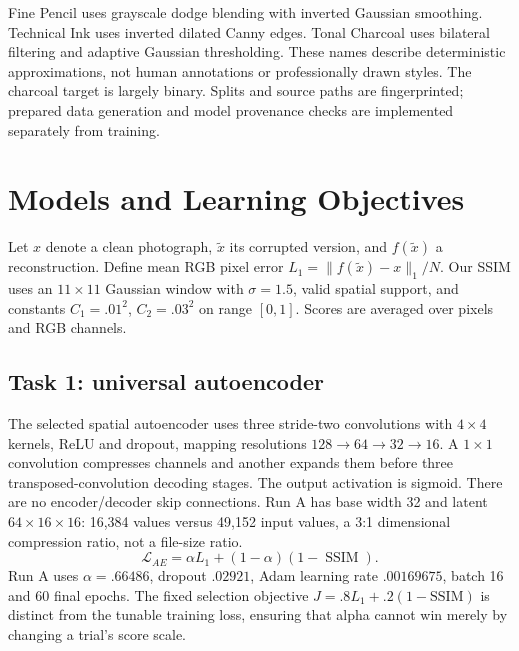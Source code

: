 \documentclass[conference]{IEEEtran}
\begin{document}
Fine Pencil uses grayscale dodge blending with inverted Gaussian smoothing. Technical Ink uses inverted dilated Canny edges. Tonal Charcoal uses bilateral filtering and adaptive Gaussian thresholding. These names describe deterministic approximations, not human annotations or professionally drawn styles. The charcoal target is largely binary. Splits and source paths are fingerprinted; prepared data generation and model provenance checks are implemented separately from training.

\section{Models and Learning Objectives}
Let $x$ denote a clean photograph, $\tilde{x}$ its corrupted version, and $f(\tilde{x})$ a reconstruction. Define mean RGB pixel error $L_1=\|f(\tilde{x})-x\|_1/N$. Our SSIM uses an $11\times11$ Gaussian window with $\sigma=1.5$, valid spatial support, and constants $C_1=.01^2$, $C_2=.03^2$ on range $[0,1]$. Scores are averaged over pixels and RGB channels.

\subsection{Task 1: universal autoencoder}
The selected spatial autoencoder uses three stride-two convolutions with $4\times4$ kernels, ReLU and dropout, mapping resolutions $128\to64\to32\to16$. A $1\times1$ convolution compresses channels and another expands them before three transposed-convolution decoding stages. The output activation is sigmoid. There are no encoder/decoder skip connections. Run A has base width 32 and latent $64\times16\times16$: 16,384 values versus 49,152 input values, a 3:1 dimensional compression ratio, not a file-size ratio.
\begin{equation}\mathcal{L}_{AE}=\alpha L_1+(1-\alpha)(1-\operatorname{SSIM}).\end{equation}
Run A uses $\alpha=.66486$, dropout $.02921$, Adam learning rate $.00169675$, batch 16 and 60 final epochs. The fixed selection objective $J=.8L_1+.2(1-\mathrm{SSIM})$ is distinct from the tunable training loss, ensuring that alpha cannot win merely by changing a trial's score scale.
\end{document}
